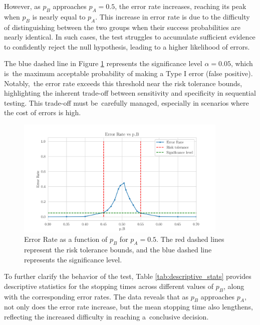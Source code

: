 \documentclass[magisterska, english]{pwr_wmat_praca_dyplomowa}
\theoremstyle{plain}
\numberwithin{theorem}{chapter}
\theoremstyle{definition}
\numberwithin{theorem}{chapter}
\begin{document}
However, as \( p_B \) approaches \( p_A = 0.5 \), the error rate increases, reaching its peak when \( p_B \) is nearly equal to \( p_A \). This increase in error rate is due to the difficulty of distinguishing between the two groups when their success probabilities are nearly identical. In such cases, the test struggles to accumulate sufficient evidence to confidently reject the null hypothesis, leading to a higher likelihood of errors.

The blue dashed line in Figure \ref{fig:error_rate_pa05} represents the significance level \( \alpha = 0.05 \), which is~the maximum acceptable probability of making a Type I error (false positive). Notably,~the error rate exceeds this threshold near the risk tolerance bounds, highlighting the inherent trade-off between sensitivity and specificity in sequential testing. This trade-off must be~carefully managed, especially in scenarios where the cost of errors is high.

\begin{figure}[H]
	\centering
	\includegraphics[width=0.9\textwidth]{images/error_rate_pa05.png}
	\caption{Error Rate as a function of \( p_B \) for \( p_A = 0.5 \). The red dashed lines represent the risk tolerance bounds, and the blue dashed line represents the significance level.}
	\label{fig:error_rate_pa05}
\end{figure}

To further clarify the behavior of the test, Table \ref{tab:descriptive_stats} provides descriptive statistics for the stopping times across different values of \( p_B \), along with the corresponding error rates. The data reveals that as \( p_B \) approaches \( p_A \), not only does the error rate increase, but the mean stopping time also lengthens, reflecting the increased difficulty in reaching a~conclusive decision.
\end{document}
